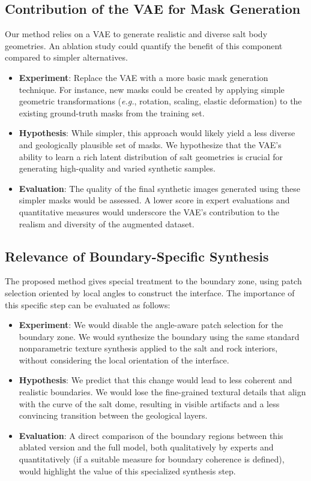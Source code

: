 \documentclass{ieeeaccess}
\begin{document}
\subsection{Contribution of the VAE for Mask Generation}

Our method relies on a VAE to generate realistic and diverse salt body geometries. An ablation study could quantify the benefit of this component compared to simpler alternatives.

\begin{itemize}
    \item \textbf{Experiment}: Replace the VAE with a more basic mask generation technique. For instance, new masks could be created by applying simple geometric transformations (\emph{e.g.}, rotation, scaling, elastic deformation) to the existing ground-truth masks from the training set.
    \item \textbf{Hypothesis}: While simpler, this approach would likely yield a less diverse and geologically plausible set of masks. We hypothesize that the VAE's ability to learn a rich latent distribution of salt geometries is crucial for generating high-quality and varied synthetic samples.
    \item \textbf{Evaluation}: The quality of the final synthetic images generated using these simpler masks would be assessed. A lower score in expert evaluations and quantitative measures would underscore the VAE's contribution to the realism and diversity of the augmented dataset.
\end{itemize}

\subsection{Relevance of Boundary-Specific Synthesis}

The proposed method gives special treatment to the boundary zone, using patch selection oriented by local angles to construct the interface. The importance of this specific step can be evaluated as follows:

\begin{itemize}
    \item \textbf{Experiment}: We would disable the angle-aware patch selection for the boundary zone. We would synthesize the boundary using the same standard nonparametric texture synthesis applied to the salt and rock interiors, without considering the local orientation of the interface.
    \item \textbf{Hypothesis}: We predict that this change would lead to less coherent and realistic boundaries. We would lose the fine-grained textural details that align with the curve of the salt dome, resulting in visible artifacts and a less convincing transition between the geological layers.
    \item \textbf{Evaluation}: A direct comparison of the boundary regions between this ablated version and the full model, both qualitatively by experts and quantitatively (if a suitable measure for boundary coherence is defined), would highlight the value of this specialized synthesis step.
\end{itemize}
\end{document}
